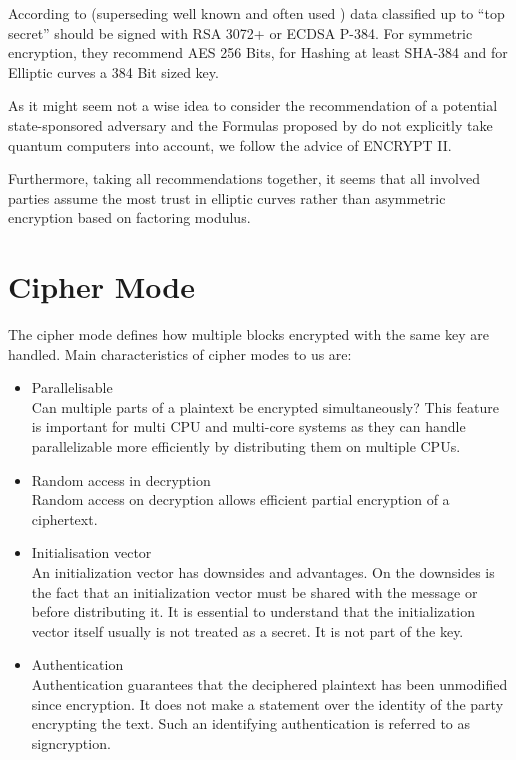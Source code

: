 According to \cite{CNSASuite} (superseding well known and often used \cite{nsa-fact-sheet-B}) data classified up to ``top secret'' should be signed with RSA 3072+ or ECDSA P-384.  For symmetric encryption, they recommend AES 256 Bits, for Hashing at least SHA-384 and for Elliptic curves a 384 Bit sized key.

As it might seem not a wise idea to consider the recommendation of a potential state-sponsored adversary and the Formulas proposed by \citeauthor{Lenstra04keylength.} do not explicitly take quantum computers into account, we follow the advice of ENCRYPT II.

Furthermore, taking all recommendations together, it seems that all involved parties assume the most trust in elliptic curves rather than asymmetric encryption based on factoring modulus.

\section{Cipher Mode}
The cipher mode defines how multiple blocks encrypted with the same key are handled. Main characteristics of cipher modes to us are:
\begin{itemize}
	\item Parallelisable\\ 
	Can multiple parts of a plaintext be encrypted simultaneously? This feature is important for multi CPU and multi-core systems as they can handle parallelizable more efficiently by distributing them on multiple CPUs.
	\item Random access in decryption\\
	Random access on decryption allows efficient partial encryption of a ciphertext.
	\item Initialisation vector\\
	An initialization vector has downsides and advantages. On the downsides is the fact that an initialization vector must be shared with the message or before distributing it. It is essential to understand that the initialization vector itself usually is not treated as a secret. It is not part of the key.
	\item Authentication\\
	Authentication guarantees that the deciphered plaintext has been unmodified since encryption. It does not make a statement over the identity of the party encrypting the text. Such an identifying authentication is referred to as signcryption.
\end{itemize}

